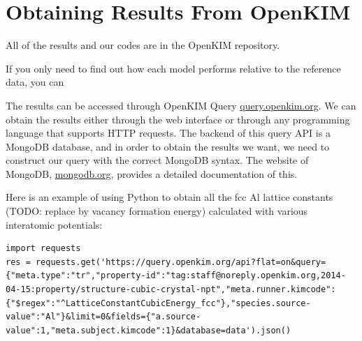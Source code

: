 \documentclass[%
 reprint,
 amsmath,amssymb,
 aps,
]{revtex4-1}
\begin{document}
\section{Obtaining Results From OpenKIM}
\label{app:data}
All of the results and our codes are in the OpenKIM repository.

If you only need to find out how each model performs relative to the reference data, you can

The results can be accessed through OpenKIM Query \url{query.openkim.org}.
We can obtain the results either through the web interface or through any programming language that supports HTTP requests.
The backend of this query API is a MongoDB database, and in order to obtain the results we want, we need to construct our query with the correct MongoDB syntax.
The website of MongoDB, \url{mongodb.org}, provides a detailed documentation of this.

Here is an example of using Python to obtain all the fcc Al lattice constants (TODO: replace by vacancy formation energy) calculated with various interatomic potentials:
\begin{lstlisting}
import requests
res = requests.get('https://query.openkim.org/api?flat=on&query={"meta.type":"tr","property-id":"tag:staff@noreply.openkim.org,2014-04-15:property/structure-cubic-crystal-npt","meta.runner.kimcode":{"$regex":"^LatticeConstantCubicEnergy_fcc"},"species.source-value":"Al"}&limit=0&fields={"a.source-value":1,"meta.subject.kimcode":1}&database=data').json()
\end{lstlisting}
\end{document}
